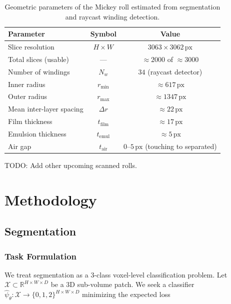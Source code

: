 \documentclass[11pt,a4paper]{article}
\newcommand{\R}{\mathbb{R}}
\begin{document}
\begin{table}[H]
\centering
\begin{tabular}{lcc}
\toprule
Parameter & Symbol & Value \\
\midrule
Slice resolution & $H \times W$ & $3063 \times 3062\,\text{px}$ \\
Total slices (usable) & --- & $\approx 2000$ of $\approx 3000$ \\
Number of windings & $N_w$ & $34$ (raycast detector) \\
Inner radius & $r_{\min}$ & $\approx 617\,\text{px}$ \\
Outer radius & $r_{\max}$ & $\approx 1347\,\text{px}$ \\
Mean inter-layer spacing & $\Delta r$ & $\approx 22\,\text{px}$ \\
Film thickness & $t_{\text{film}}$ & $\approx 17\,\text{px}$ \\
Emulsion thickness & $t_{\text{emul}}$ & $\approx 5\,\text{px}$ \\
Air gap & $t_{\text{air}}$ & $0$--$5\,\text{px}$ (touching to separated) \\
\bottomrule
\end{tabular}
\caption{Geometric parameters of the Mickey roll estimated from segmentation and raycast winding detection.}
\label{tab:roll_geometry}
\end{table}


TODO: Add other upcoming scanned rolls.


\section{Methodology}

\subsection{Segmentation}
\label{sec:segmentation}

\subsubsection{Task Formulation}

We treat segmentation as a 3-class voxel-level classification problem. Let $\mathcal{X} \subset \R^{H \times W \times D}$ be a 3D sub-volume patch. We seek a classifier $\hat{\psi}_\theta : \mathcal{X} \to \{0,1,2\}^{H \times W \times D}$ minimizing the expected loss
\end{document}
